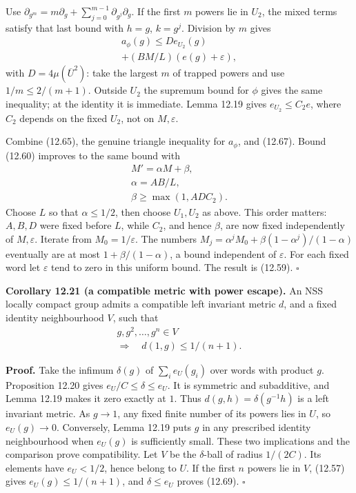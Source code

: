 \documentclass[
  11pt,
]{article}
\begin{document}
Use \(\partial_{g^m}=m\partial_g+
\sum_{j=0}^{m-1}\partial_{g^j}\partial_g\). If the first \(m\) powers
lie in \(U_2\), the mixed terms satisfy that last bound with \(h=g\),
\(k=g^j\). Division by \(m\) gives \[
\begin{gathered}
a_\phi(g)\leq D e_{U_2}(g)\\
+(BM/L)(e(g)+\varepsilon),
\end{gathered}
\tag{12.67}
\] with \(D=4\mu(\overline U^2)\): take the largest \(m\) of trapped
powers and use \(1/m\leq2/(m+1)\). Outside \(U_2\) the supremum bound
for \(\phi\) gives the same inequality; at the identity it is immediate.
Lemma 12.19 gives \(e_{U_2}\leq C_2e\), where \(C_2\) depends on the
fixed \(U_2\), not on \(M,\varepsilon\).

Combine (12.65), the genuine triangle inequality for \(a_\phi\), and
(12.67). Bound (12.60) improves to the same bound with \[
\begin{gathered}
M'=\alpha M+\beta,\\
\alpha=AB/L,\\
\beta\geq\max(1,ADC_2).
\end{gathered}
\tag{12.68}
\] Choose \(L\) so that \(\alpha\leq1/2\), then choose \(U_1,U_2\) as
above. This order matters: \(A,B,D\) were fixed before \(L\), while
\(C_2\), and hence \(\beta\), are now fixed independently of
\(M,\varepsilon\). Iterate from \(M_0=1/\varepsilon\). The numbers
\(M_j=\alpha^jM_0+\beta(1-\alpha^j)/(1-\alpha)\) eventually are at most
\(1+\beta/(1-\alpha)\), a bound independent of \(\varepsilon\). For each
fixed word let \(\varepsilon\) tend to zero in this uniform bound. The
result is (12.59). \(\square\)

\textbf{Corollary 12.21 (a compatible metric with power escape).} An NSS
locally compact group admits a compatible left invariant metric \(d\),
and a fixed identity neighbourhood \(V\), such that \[
\begin{gathered}
g,g^2,\ldots,g^n\in V\\
\Longrightarrow\quad d(1,g)\leq1/(n+1).
\end{gathered}
\tag{12.69}
\]

\textbf{Proof.} Take the infimum \(\delta(g)\) of \(\sum_i e_U(g_i)\)
over words with product \(g\). Proposition 12.20 gives
\(e_U/C\leq\delta\leq e_U\). It is symmetric and subadditive, and Lemma
12.19 makes it zero exactly at \(1\). Thus \(d(g,h)=\delta(g^{-1}h)\) is
a left invariant metric. As \(g\to1\), any fixed finite number of its
powers lies in \(U\), so \(e_U(g)\to0\). Conversely, Lemma 12.19 puts
\(g\) in any prescribed identity neighbourhood when \(e_U(g)\) is
sufficiently small. These two implications and the comparison prove
compatibility. Let \(V\) be the \(\delta\)-ball of radius \(1/(2C)\).
Its elements have \(e_U<1/2\), hence belong to \(U\). If the first \(n\)
powers lie in \(V\), (12.57) gives \(e_U(g)\leq1/(n+1)\), and
\(\delta\leq e_U\) proves (12.69). \(\square\)
\end{document}
